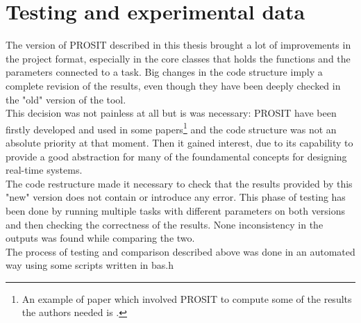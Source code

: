 \chapter{Testing and experimental data}\label{chp:experiments}


The version of PROSIT described in this thesis brought a lot of improvements in the project format, especially in the core classes that holds the functions and the parameters connected to a task. Big changes in the code structure imply a complete revision of the results, even though they have been deeply checked in the "old" version of the tool.\\
This decision was not painless at all but is was necessary: PROSIT have been firstly developed and used in some papers\footnote{An example of paper which involved PROSIT to compute some of the results the authors needed is \cite{probGuarantees}.} and the code structure was not an absolute priority at that moment. Then it gained interest, due to its capability to provide a good abstraction for many of the foundamental concepts for designing real-time systems.\\
The code restructure made it necessary to check that the results provided by this "new" version does not contain or introduce any error. This phase of testing has been done by running multiple tasks with different parameters on both versions and then checking the correctness of the results. None inconsistency in the outputs was found while comparing the two.\\
The process of testing and comparison described above was done in an automated way using some scripts written in bas.h

